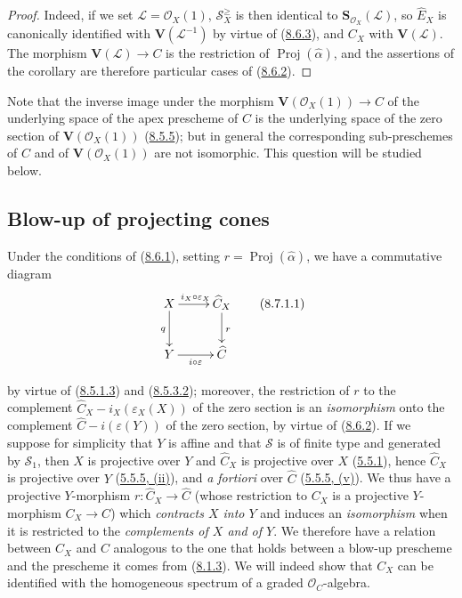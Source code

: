 \begin{proof}
Indeed, if we set $\mathcal{L}=\mathcal{O}_X(1)$,
$\mathcal{S}_X^{\geq}$ is then identical to
$\mathbf{S}_{\mathcal{O}_X}(\mathcal{L})$, so $\widehat{E}_X$ is canonically
identified with $\mathbf{V}(\mathcal{L}^{-1})$ by virtue of
(\hyperref[II.8.6.3]{8.6.3}), and $C_X$ with $\mathbf{V}(\mathcal{L})$. The
morphism $\mathbf{V}(\mathcal{L})\to C$ is the restriction of
$\operatorname{Proj}(\widehat{\alpha})$, and the assertions of the corollary are
therefore particular cases of (\hyperref[II.8.6.2]{8.6.2}).
\end{proof}

Note that the inverse image under the morphism
$\mathbf{V}(\mathcal{O}_X(1))\to C$ of the underlying space of the apex
prescheme of $C$ is the underlying space of the zero section of
$\mathbf{V}(\mathcal{O}_X(1))$ (\hyperref[II.8.5.5]{8.5.5}); but in
general the corresponding sub-preschemes of $C$ and of
$\mathbf{V}(\mathcal{O}_X(1))$ are not isomorphic. This question will be
studied below.

\subsection{Blow-up of projecting cones}
\label{subsection:II.8.7}

\begin{env}[8.7.1]
\label{II.8.7.1}
Under the conditions of (\hyperref[II.8.6.1]{8.6.1}), setting
$r=\operatorname{Proj}(\widehat{\alpha})$, we have a commutative diagram
\begin{equation}
\label{II.8.7.1.1}
  \xymatrix{
    X\ar[r]^{i_X\circ\varepsilon_X}\ar[d]_{q} &
    \widehat{C}_X\ar[d]^{r}\\
    Y\ar[r]_{i\circ\varepsilon} & \widehat{C}
  }
\tag{8.7.1.1}
\end{equation}

by virtue of (\hyperref[II.8.5.1.3]{8.5.1.3}) and
(\hyperref[II.8.5.3.2]{8.5.3.2}); moreover, the restriction of $r$ to the
complement $\widehat{C}_X-i_X(\varepsilon_X(X))$ of the zero section is an
\emph{isomorphism} onto the complement $\widehat{C}-i(\varepsilon(Y))$ of the
zero section, by virtue of (\hyperref[II.8.6.2]{8.6.2}). If we suppose for
simplicity that $Y$ is affine and that $\mathcal{S}$ is of finite type and
generated by $\mathcal{S}_1$, then $X$ is projective over $Y$ and
$\widehat{C}_X$ is projective over $X$ (\hyperref[II.5.5.1]{5.5.1}), hence
$\widehat{C}_X$ is projective over $Y$ (\hyperref[II.5.5.5]{5.5.5, (ii)}),
and \emph{a fortiori} over $\widehat{C}$ (\hyperref[II.5.5.5]{5.5.5, (v)}).
We thus have a projective $Y$-morphism $r:\widehat{C}_X\to\widehat{C}$ (whose
restriction to $C_X$ is a projective $Y$-morphism $C_X\to C$) which
\emph{contracts $X$ into $Y$} and induces an \emph{isomorphism} when it is
restricted to the \emph{complements of $X$ and of $Y$}. We therefore have a
relation between $C_X$ and $C$ analogous to the one that holds between a
blow-up prescheme and the prescheme it comes from
(\hyperref[II.8.1.3]{8.1.3}). We will indeed show that $C_X$ can be
identified with the homogeneous spectrum of a graded $\mathcal{O}_C$-algebra.
\end{env}

